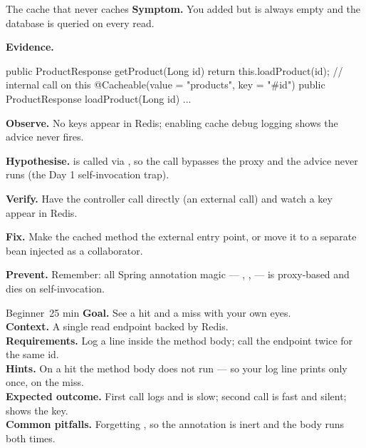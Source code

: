 \begin{debuglab}{The cache that never caches}
\textbf{Symptom.} You added  but  is always empty and the database is queried on every read.

\smallskip\textbf{Evidence.}
\begin{javabox}
public ProductResponse getProduct(Long id) {
  return this.loadProduct(id);          // internal call on this
}
@Cacheable(value = "products", key = "#id")
public ProductResponse loadProduct(Long id) { ... }
\end{javabox}

\begin{tickcheck}
  \item \textbf{Observe.} No keys appear in Redis; enabling cache debug logging shows the advice never fires.
  \item \textbf{Hypothesise.}  is called via , so the call bypasses the proxy and the  advice never runs (the Day 1 self-invocation trap).
  \item \textbf{Verify.} Have the controller call  directly (an external call) and watch a key appear in Redis.
  \item \textbf{Fix.} Make the cached method the external entry point, or move it to a separate bean injected as a collaborator.
  \item \textbf{Prevent.} Remember: all Spring annotation magic --- , ,  --- is proxy-based and dies on self-invocation.
\end{tickcheck}
\end{debuglab}


\begin{minilab}{Beginner}{~25 min}
\textbf{Goal.} See a hit and a miss with your own eyes.\\
\textbf{Context.} A single  read endpoint backed by Redis.\\
\textbf{Requirements.} Log a line inside the method body; call the endpoint twice for the same id.\\
\textbf{Hints.} On a hit the method body does not run --- so your log line prints only once, on the miss.\\
\textbf{Expected outcome.} First call logs and is slow; second call is fast and silent;  shows the key.\\
\textbf{Common pitfalls.} Forgetting , so the annotation is inert and the body runs both times.
\end{minilab}

